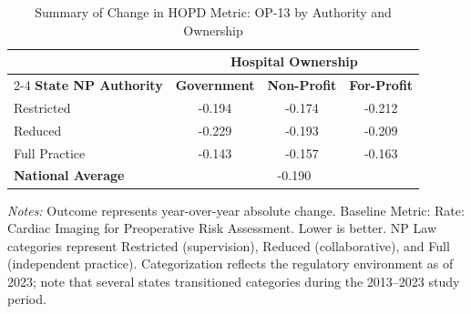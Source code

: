 \begin{table}[htbp]
    \centering
    \caption{Summary of Change in HOPD Metric: OP-13 by Authority and Ownership}
    \label{tab:d_hopd_op_13}
    \vspace{0.2cm}
    \begin{tabular}{lccc}
        \toprule
        & \multicolumn{3}{c}{\textbf{Hospital Ownership}} \\
        \cmidrule(lr){2-4}
        \textbf{State NP Authority} & \textbf{Government} & \textbf{Non-Profit} & \textbf{For-Profit} \\
        \midrule
        Restricted & -0.194 & -0.174 & -0.212 \\
        Reduced & -0.229 & -0.193 & -0.209 \\
        Full Practice & -0.143 & -0.157 & -0.163 \\
        \midrule
        \textbf{National Average} & \multicolumn{3}{c}{-0.190} \\
        \bottomrule
    \end{tabular}
    \vspace{0.1cm}
    \begin{minipage}{0.85\textwidth}
        \footnotesize \textit{Notes:} Outcome represents year-over-year absolute change. Baseline Metric: Rate: Cardiac Imaging for Preoperative Risk Assessment. Lower is better. NP Law categories represent Restricted (supervision), Reduced (collaborative), and Full (independent practice). Categorization reflects the regulatory environment as of 2023; note that several states transitioned categories during the 2013--2023 study period.
    \end{minipage}
\end{table}